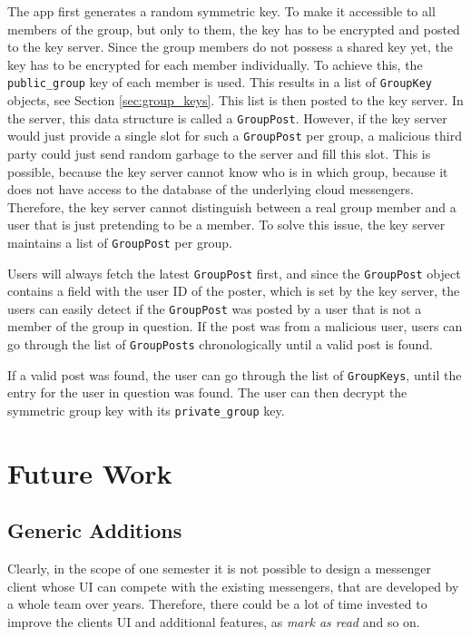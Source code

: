 \documentclass[a4paper, oneside]{discothesis}
\begin{document}
The app first generates a random symmetric key. To make it accessible to all members of the group, but only to them, the key has to be encrypted and posted to the key server. Since the group members do not possess a shared key yet, the key has to be encrypted for each member individually. To achieve this, the \texttt{public\_group} key of each member is used. This results in a list of \texttt{GroupKey} objects, see Section \ref{sec:group_keys}. This list is then posted to the key server. In the server, this data structure is called a \texttt{GroupPost}. However, if the key server would just provide a single slot for such a \texttt{GroupPost} per group, a malicious third party could just send random garbage to the server and fill this slot. This is possible, because the key server cannot know who is in which group, because it does not have access to the database of the underlying cloud messengers. Therefore, the key server cannot distinguish between a real group member and a user that is just pretending to be a member. To solve this issue, the key server maintains a list of \texttt{GroupPost} per group.

Users will always fetch the latest \texttt{GroupPost} first, and since the \texttt{GroupPost} object contains a field with the user ID of the poster, which is set by the key server, the users can easily detect if the \texttt{GroupPost} was posted by a user that is not a member of the group in question. If the post was from a malicious user, users can go through the list of \texttt{GroupPosts} chronologically until a valid post is found.

If a valid post was found, the user can go through the list of \texttt{GroupKeys}, until the entry for the user in question was found. The user can then decrypt the symmetric group key with its \texttt{private\_group} key.

\chapter{Future Work}
\label{sec:future_work}

\section{Generic Additions}

Clearly, in the scope of one semester it is not possible to design a messenger client whose UI can compete with the existing messengers, that are developed by a whole team over years. Therefore, there could be a lot of time invested to improve the clients UI and additional features, as \emph{mark as read} and so on.
\end{document}
